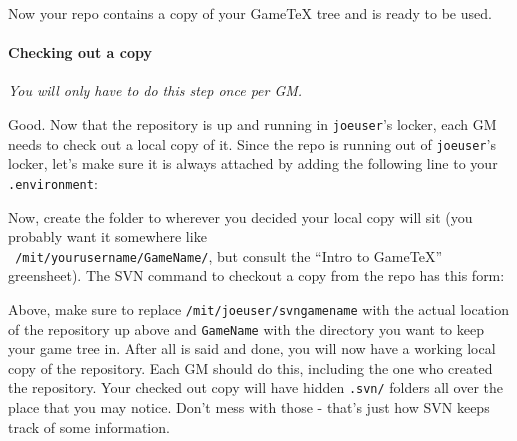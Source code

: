 \documentclass[green]{testgame}
\begin{document}

Now your repo contains a copy of your GameTeX tree and is ready to be
used.

\paragraph*{Checking out a copy}

{\em You will only have to do this step once per GM.}

Good. Now that the repository is up and running in {\tt joeuser}'s
locker, each GM needs to check out a local copy of it. Since the repo
is running out of {\tt joeuser}'s locker, let's make sure it is always
attached by adding the following line to your {\tt .environment}:


Now, create the folder to wherever you decided your local copy will
sit (you probably want it somewhere like\\ {\tt
/mit/yourusername/GameName/}, but consult the ``Intro to GameTeX''
greensheet). The SVN command to checkout a copy from the repo has this
form:


Above, make sure to replace {\tt /mit/joeuser/svngamename} with the
actual location of the repository up above and {\tt GameName} with the
directory you want to keep your game tree in. After all is said and
done, you will now have a working local copy of the repository. Each
GM should do this, including the one who created the repository. Your
checked out copy will have hidden {\tt .svn/} folders all over the
place that you may notice. Don't mess with those - that's just how SVN
keeps track of some information.
\end{document}
